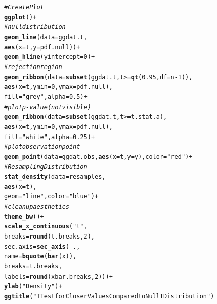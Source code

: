 \documentclass{article}\usepackage[]{graphicx}\usepackage[]{xcolor}
\makeatletter
\newcommand{\hlnum}[1]{\textcolor[rgb]{0.686,0.059,0.569}{#1}}%
\newcommand{\hlsng}[1]{\textcolor[rgb]{0.192,0.494,0.8}{#1}}%
\newcommand{\hlcom}[1]{\textcolor[rgb]{0.678,0.584,0.686}{\textit{#1}}}%
\newcommand{\hlopt}[1]{\textcolor[rgb]{0,0,0}{#1}}%
\newcommand{\hldef}[1]{\textcolor[rgb]{0.345,0.345,0.345}{#1}}%
\newcommand{\hlkwc}[1]{\textcolor[rgb]{0.333,0.667,0.333}{#1}}%
\newcommand{\hlkwd}[1]{\textcolor[rgb]{0.737,0.353,0.396}{\textbf{#1}}}%
\newenvironment{kframe}{%
 \def\at@end@of@kframe{}%
 \ifinner\ifhmode%
  \def\at@end@of@kframe{\end{minipage}}%
  \begin{minipage}{\columnwidth}%
 \fi\fi%
 \def\FrameCommand##1{\hskip\@totalleftmargin \hskip-\fboxsep
 \colorbox{shadecolor}{##1}\hskip-\fboxsep
     \hskip-\linewidth \hskip-\@totalleftmargin \hskip\columnwidth}%
 \MakeFramed {\advance\hsize-\width
   \@totalleftmargin\z@ \linewidth\hsize
   \@setminipage}}%
 {\par\unskip\endMakeFramed%
 \at@end@of@kframe}
\newenvironment{knitrout}{}{} %
\makeatother
\begin{document}
\begin{enumerate}
\begin{enumerate}
\begin{knitrout}
\begin{kframe}
\begin{alltt}
\hlcom{# Create Plot}
\hlkwd{ggplot}\hldef{()} \hlopt{+}
  \hlcom{# null distribution}
  \hlkwd{geom_line}\hldef{(}\hlkwc{data}\hldef{=ggdat.t,}
            \hlkwd{aes}\hldef{(}\hlkwc{x}\hldef{=t,} \hlkwc{y}\hldef{=pdf.null))}\hlopt{+}
  \hlkwd{geom_hline}\hldef{(}\hlkwc{yintercept}\hldef{=}\hlnum{0}\hldef{)}\hlopt{+}
  \hlcom{# rejection region}
  \hlkwd{geom_ribbon}\hldef{(}\hlkwc{data}\hldef{=}\hlkwd{subset}\hldef{(ggdat.t, t}\hlopt{>=}\hlkwd{qt}\hldef{(}\hlnum{0.95}\hldef{,} \hlkwc{df}\hldef{=n}\hlopt{-}\hlnum{1}\hldef{)),}
              \hlkwd{aes}\hldef{(}\hlkwc{x}\hldef{=t,} \hlkwc{ymin}\hldef{=}\hlnum{0}\hldef{,} \hlkwc{ymax}\hldef{=pdf.null),}
              \hlkwc{fill}\hldef{=}\hlsng{"grey"}\hldef{,} \hlkwc{alpha}\hldef{=}\hlnum{0.5}\hldef{)}\hlopt{+}
  \hlcom{# plot p-value (not visible)}
  \hlkwd{geom_ribbon}\hldef{(}\hlkwc{data}\hldef{=}\hlkwd{subset}\hldef{(ggdat.t, t}\hlopt{>=}\hldef{t.stat.a),}
              \hlkwd{aes}\hldef{(}\hlkwc{x}\hldef{=t,} \hlkwc{ymin}\hldef{=}\hlnum{0}\hldef{,} \hlkwc{ymax}\hldef{=pdf.null),}
              \hlkwc{fill}\hldef{=}\hlsng{"white"}\hldef{,} \hlkwc{alpha}\hldef{=}\hlnum{0.25}\hldef{)}\hlopt{+}
  \hlcom{# plot observation point}
  \hlkwd{geom_point}\hldef{(}\hlkwc{data}\hldef{=ggdat.obs,} \hlkwd{aes}\hldef{(}\hlkwc{x}\hldef{=t,} \hlkwc{y}\hldef{=y),} \hlkwc{color}\hldef{=}\hlsng{"red"}\hldef{)}\hlopt{+}
  \hlcom{# Resampling Distribution}
  \hlkwd{stat_density}\hldef{(}\hlkwc{data}\hldef{=resamples,}
               \hlkwd{aes}\hldef{(}\hlkwc{x}\hldef{=t),}
               \hlkwc{geom}\hldef{=}\hlsng{"line"}\hldef{,} \hlkwc{color}\hldef{=}\hlsng{"blue"}\hldef{)}\hlopt{+}
  \hlcom{# clean up aesthetics}
  \hlkwd{theme_bw}\hldef{()}\hlopt{+}
  \hlkwd{scale_x_continuous}\hldef{(}\hlsng{"t"}\hldef{,}
                     \hlkwc{breaks} \hldef{=} \hlkwd{round}\hldef{(t.breaks,}\hlnum{2}\hldef{),}
                     \hlkwc{sec.axis} \hldef{=} \hlkwd{sec_axis}\hldef{(}\hlopt{~}\hldef{.,}
                                         \hlkwc{name} \hldef{=} \hlkwd{bquote}\hldef{(}\hlkwd{bar}\hldef{(x)),}
                                         \hlkwc{breaks} \hldef{= t.breaks,}
                                         \hlkwc{labels} \hldef{=} \hlkwd{round}\hldef{(xbar.breaks,}\hlnum{2}\hldef{)))} \hlopt{+}
  \hlkwd{ylab}\hldef{(}\hlsng{"Density"}\hldef{)}\hlopt{+}
  \hlkwd{ggtitle}\hldef{(}\hlsng{"T Test for Closer Values Compared to Null T Distribution"}\hldef{)}
\end{alltt}
\end{kframe}

\end{knitrout}
\end{enumerate}
\end{enumerate}
\end{document}
